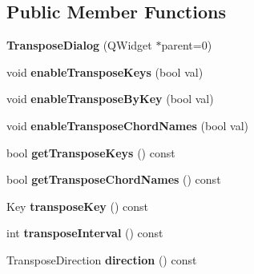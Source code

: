 \subsection*{Public Member Functions}
\begin{DoxyCompactItemize}
\item 
\mbox{\label{class_ms_1_1_transpose_dialog_a834d8d333ecd2286f5b2fb24de1929d4}} 
{\bfseries Transpose\+Dialog} (Q\+Widget $\ast$parent=0)
\item 
\mbox{\label{class_ms_1_1_transpose_dialog_ab2fd21dec1cd67cff249155bf1fba1f0}} 
void {\bfseries enable\+Transpose\+Keys} (bool val)
\item 
\mbox{\label{class_ms_1_1_transpose_dialog_a2c969df91ff5d2c26eb3f148d3d6d21f}} 
void {\bfseries enable\+Transpose\+By\+Key} (bool val)
\item 
\mbox{\label{class_ms_1_1_transpose_dialog_a58d361f809d63656a35f4d2028903fd1}} 
void {\bfseries enable\+Transpose\+Chord\+Names} (bool val)
\item 
\mbox{\label{class_ms_1_1_transpose_dialog_a9291123668ff127cd0f30ead694f9c99}} 
bool {\bfseries get\+Transpose\+Keys} () const
\item 
\mbox{\label{class_ms_1_1_transpose_dialog_aabf514ad101d7c2a178f50f4c54d5afb}} 
bool {\bfseries get\+Transpose\+Chord\+Names} () const
\item 
\mbox{\label{class_ms_1_1_transpose_dialog_ac1efd570f127c481b87a632ab3f3cd46}} 
Key {\bfseries transpose\+Key} () const
\item 
\mbox{\label{class_ms_1_1_transpose_dialog_a29f5a92424a37ee950eaae11398216fd}} 
int {\bfseries transpose\+Interval} () const
\item 
\mbox{\label{class_ms_1_1_transpose_dialog_a642493d81b706dfbbe61d850504394aa}} 
Transpose\+Direction {\bfseries direction} () const
\item 

\end{DoxyCompactItemize}
